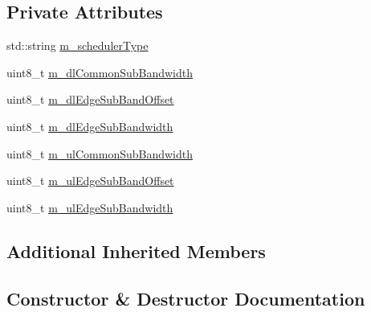 \subsection*{Private Attributes}
\begin{DoxyCompactItemize}
\item 
std\+::string \hyperlink{classLteStrictFrTestCase_a98552dea8dd02f0d9edb7d71ca4ba533}{m\+\_\+scheduler\+Type}
\item 
uint8\+\_\+t \hyperlink{classLteStrictFrTestCase_ade1216e9161be5712e6c7e9101589179}{m\+\_\+dl\+Common\+Sub\+Bandwidth}
\item 
uint8\+\_\+t \hyperlink{classLteStrictFrTestCase_a868cea1d757a5a1242367ae2e2586fed}{m\+\_\+dl\+Edge\+Sub\+Band\+Offset}
\item 
uint8\+\_\+t \hyperlink{classLteStrictFrTestCase_a58d600143fb7070864722d3fcbb74d35}{m\+\_\+dl\+Edge\+Sub\+Bandwidth}
\item 
uint8\+\_\+t \hyperlink{classLteStrictFrTestCase_a11cec568aeb868ad01cb3ae2404b59bb}{m\+\_\+ul\+Common\+Sub\+Bandwidth}
\item 
uint8\+\_\+t \hyperlink{classLteStrictFrTestCase_a92234751b6af7f82f3c576288619bbb2}{m\+\_\+ul\+Edge\+Sub\+Band\+Offset}
\item 
uint8\+\_\+t \hyperlink{classLteStrictFrTestCase_acef297528c21c8a9255794ecb0150b04}{m\+\_\+ul\+Edge\+Sub\+Bandwidth}
\end{DoxyCompactItemize}
\subsection*{Additional Inherited Members}


\subsection{Constructor \& Destructor Documentation}
